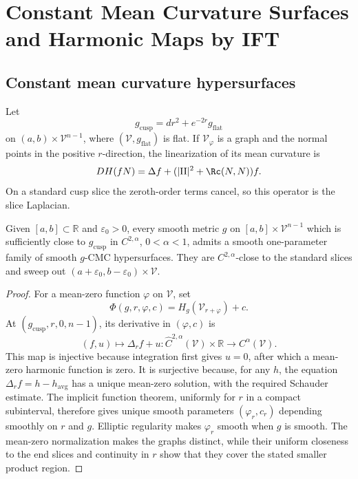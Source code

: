 \chapter[34]{Constant Mean Curvature Surfaces and Harmonic Maps by IFT}
\label{ch:chow-iv-cmc-surfaces-harmonic-maps-ift}

\section{Constant mean curvature hypersurfaces}

Let
\[
 g_{\mathrm{cusp}}=dr^2+e^{-2r}g_{\mathrm{flat}}
\]
on \((a,b)\times\mathcal V^{n-1}\), where \((\mathcal V,g_{\mathrm{flat}})\)
is flat.  If \(\mathcal V_\varphi\) is a graph and the normal points in the
positive \(r\)-direction, the linearization of its mean curvature is
\[
 DH(fN)=\Delta f+(|\mathrm{II}|^2+\Rc(N,N))f.
\]
On a standard cusp slice the zeroth-order terms cancel, so this operator is
the slice Laplacian.

\begin{proposition}
\label{prop:chow-iv-cmc-sweepout-almost-hyperbolic-cusp}
Given \([a,b]\subset\mathbb R\) and \(\varepsilon_0>0\), every smooth metric
\(g\) on \([a,b]\times\mathcal V^{n-1}\) which is sufficiently close to
\(g_{\mathrm{cusp}}\) in \(C^{2,\alpha}\), \(0<\alpha<1\), admits a smooth
one-parameter family of smooth \(g\)-CMC hypersurfaces.  They are
\(C^{2,\alpha}\)-close to the standard slices and sweep out
\((a+\varepsilon_0,b-\varepsilon_0)\times\mathcal V\).
\end{proposition}
\begin{proof}
\sketch
For a mean-zero function \(\varphi\) on \(\mathcal V\), set
\[
 \Phi(g,r,\varphi,c)=H_g(\mathcal V_{r+\varphi})+c.
\]
At \((g_{\mathrm{cusp}},r,0,n-1)\), its derivative in \((\varphi,c)\) is
\[
 (f,u)\longmapsto\Delta_r f+u
 :\widehat C^{2,\alpha}(\mathcal V)\times\mathbb R
 \longrightarrow C^\alpha(\mathcal V).
\]
This map is injective because integration first gives \(u=0\), after which a
mean-zero harmonic function is zero.  It is surjective because, for any
\(h\), the equation \(\Delta_r f=h-h_{\mathrm{avg}}\) has a unique mean-zero
solution, with the required Schauder estimate.  The implicit function theorem,
uniformly for \(r\) in a compact subinterval, therefore gives unique smooth
parameters \((\varphi_r,c_r)\) depending smoothly on \(r\) and \(g\).
Elliptic regularity makes \(\varphi_r\) smooth when \(g\) is smooth.  The
mean-zero normalization makes the graphs distinct, while their uniform
closeness to the end slices and continuity in \(r\) show that they cover the
stated smaller product region.
\end{proof}

